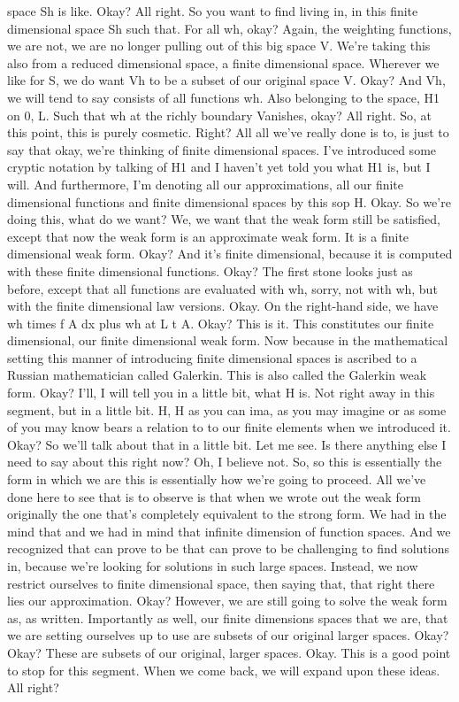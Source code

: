 \documentclass[10pt]{article}
\begin{document}
space Sh is like. Okay? All right. So you want to find living in, in this finite dimensional space Sh such that. For all wh, okay? Again, the weighting functions, we are not, we are no longer pulling out of this big space V. We're taking this also from a reduced dimensional space, a finite dimensional space. Wherever we like for S, we do want Vh to be a subset of our original space V. Okay? And Vh, we will tend to say consists of all functions wh. Also belonging to the space, H1 on 0, L. Such that wh at the richly boundary Vanishes, okay? All right. So, at this point, this is purely cosmetic. Right? All all we've really done is to, is just to say that okay, we're thinking of finite dimensional spaces. I've introduced some cryptic notation by talking of H1 and I haven't yet told you what H1 is, but I will. And furthermore, I'm denoting all our approximations, all our finite dimensional functions and finite dimensional spaces by this sop H. Okay. So we're doing this, what do we want? We, we want that the weak form still be satisfied, except that now the weak form is an approximate weak form. It is a finite dimensional weak form. Okay? And it's finite dimensional, because it is computed with these finite dimensional functions. Okay? The first stone looks just as before, except that all functions are evaluated with wh, sorry, not with wh, but with the finite dimensional law versions. Okay. On the right-hand side, we have wh times f A dx plus wh at L t A. Okay? This is it. This constitutes our finite dimensional, our finite dimensional weak form. Now because in the mathematical setting this manner of introducing finite dimensional spaces is ascribed to a Russian mathematician called Galerkin. This is also called the Galerkin weak form. Okay? I'll, I will tell you in a little bit, what H is. Not right away in this segment, but in a little bit. H, H as you can ima, as you may imagine or as some of you may know bears a relation to to our finite elements when we introduced it. Okay? So we'll talk about that in a little bit. Let me see. Is there anything else I need to say about this right now? Oh, I believe not. So, so this is essentially the form in which we are this is essentially how we're going to proceed. All we've done here to see that is to observe is that when we wrote out the weak form originally the one that's completely equivalent to the strong form. We had in the mind that and we had in mind that infinite dimension of function spaces. And we recognized that can prove to be that can prove to be challenging to find solutions in, because we're looking for solutions in such large spaces. Instead, we now restrict ourselves to finite dimensional space, then saying that, that right there lies our approximation. Okay? However, we are still going to solve the weak form as, as written. Importantly as well, our finite dimensions spaces that we are, that we are setting ourselves up to use are subsets of our original larger spaces. Okay? Okay? These are subsets of our original, larger spaces. Okay. This is a good point to stop for this segment. When we come back, we will expand upon these ideas. All right?
\end{document}
